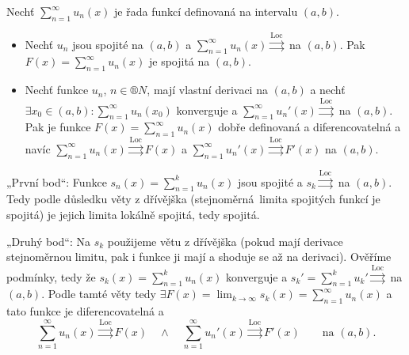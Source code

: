 \documentclass[12pt]{article}					%
\begin{document}
	\begin{veta}
		Nechť $\sum_{n=1}^∞ u_n(x)$ je řada funkcí definovaná na intervalu $(a, b)$.

		\begin{itemize}
			\item Nechť $u_n$ jsou spojité na $(a, b)$ a $\sum_{n=1}^∞ u_n(x) \overset{\text{Loc}}{\rightrightarrows}$ na $(a, b)$. Pak $F(x) = \sum_{n=1}^∞ u_n(x)$ je spojitá na $(a, b)$.
			\item Nechť funkce $u_n$, $n \in ®N$, mají vlastní derivaci na $(a, b)$ a nechť $\exists x_0 \in (a, b): \sum_{n=1}^∞ u_n(x_0)$ konverguje a $\sum_{n=1}^∞ u_n'(x) \overset{\text{Loc}}{\rightrightarrows}$ na $(a, b)$. Pak je funkce $F(x) = \sum_{n=1}^∞ u_n(x)$ dobře definovaná a diferencovatelná a navíc $\sum_{n=1}^∞ u_n(x) \overset{\text{Loc}}{\rightrightarrows} F(x)$ a $\sum_{n=1}^∞ u_n'(x) \overset{\text{Loc}}{\rightrightarrows} F'(x)$ na $(a, b)$.
		\end{itemize}

		\begin{dukazin}
			„První bod“: Funkce $s_n(x) = \sum_{n=1}^k u_n(x)$ jsou spojité a $s_k \overset{\text{Loc}}{\rightrightarrows}$ na $(a, b)$. Tedy podle důsledku věty z dřívějška (stejnoměrná limita spojitých funkcí je spojitá) je jejich limita lokálně spojitá, tedy spojitá.

			„Druhý bod“: Na $s_k$ použijeme větu z dřívějška (pokud mají derivace stejnoměrnou limitu, pak i funkce ji mají a shoduje se až na derivaci). Ověříme podmínky, tedy že $s_k(x) = \sum_{n=1}^k u_n(x)$ konverguje a $s_k' = \sum_{n=1}^k u_k' \overset{\text{Loc}}{\rightrightarrows}$ na $(a, b)$. Podle tamté věty tedy $\exists F(x) = \lim_{k \rightarrow ∞} s_k(x) = \sum_{n=1}^∞ u_n(x)$ a tato funkce je diferencovatelná a
			$$ \sum_{n=1}^∞ u_n(x) \overset{\text{Loc}}{\rightrightarrows} F(x) \quad \land \quad \sum_{n=1}^∞ u_n'(x) \overset{\text{Loc}}{\rightrightarrows} F'(x) \qquad \text{na } (a, b). $$
		\end{dukazin}
	\end{veta}
\end{document}
